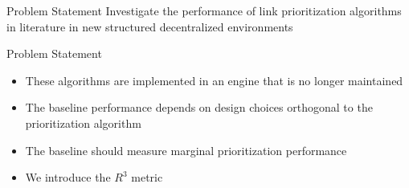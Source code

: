 \begin{frame}{Problem Statement}
    \centering
    Investigate the performance of link prioritization algorithms in literature in new structured decentralized environments
\end{frame}

\begin{frame}{Problem Statement}
    \begin{itemize}
        \item These algorithms are implemented in an engine that is no longer maintained
        \item The baseline performance depends on design choices orthogonal to the prioritization algorithm
        \item The baseline should measure marginal prioritization performance
        \item We introduce the $R^{3}$ metric
    \end{itemize}
\end{frame}
